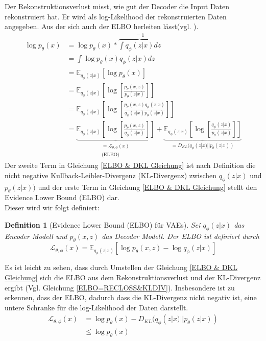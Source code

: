 \documentclass[%
thesis=student,%
coverpage=false,%
titlepage=false,%
headmarks=true, %
german,%
font=libertine, %
math=newpxtx, %
BCOR=5mm,%
coverBCOR=11mm%
]{tumbook}
\theoremstyle{break}
\newtheorem{definition}{Definition}[section]
\begin{document}
Der Rekonstruktionsverlust misst, wie gut der Decoder die Input Daten rekonstruiert hat. Er wird als log-Likelihood der rekonstruierten Daten angegeben.
Aus der sich auch der ELBO herleiten lässt(vgl. \cite{IntroductiontoVAEs}). \\
\begin{align}
 	\log p_\theta(x) &= \log p_\theta(x) * \overbrace{\int q_\phi(z|x) dz}^{=1} \\
 	&= \int \log p_\theta(x) q_\phi(z|x) dz \\
 	&= \mathbb{E}_{q_\phi(z|x)}[\log p_\theta(x)] \\
 	&= \mathbb{E}_{q_\phi(z|x)}\left[\log\left[ \frac{p_\theta(x,z)}{p_\theta(z|x)}\right]\right] \\
 	&= \mathbb{E}_{q_\phi(z|x)}\left[\log\left[ \frac{p_\theta(x,z)q_\phi(z|x)}{q_\phi(z|x)p_\theta(z|x)}\right]\right] \\
 	&= \underbrace{\mathbb{E}_{q_\phi(z|x)}\left[\log\left[ \frac{p_\theta(x,z)}{q_\phi(z|x)}\right]\right]}_{\substack{\text{$= \mathcal{L}_{\theta,\phi}(x)$}\\\text{(ELBO)}}} + \underbrace{\mathbb{E}_{q_\phi(z|x)}\left[\log\left[ \frac{q_\phi(z|x)}{p_\theta(z|x)}\right]\right]}_{=D_{KL}(q_\phi(z|x)||p_\theta(z|x))} \label{ELBO & DKL Gleichung}
\end{align}
Der zweite Term in Gleichung \ref{ELBO & DKL Gleichung} ist nach Definition die nicht negative Kullback-Leibler-Divergenz (KL-Divergenz) zwischen $q_\phi(z|x)$ und $p_\theta(z|x))$ und der erste Term in Gleichung \ref{ELBO & DKL Gleichung} stellt den Evidence Lower Bound (ELBO) dar.\\
Dieser wird wir folgt definiert:\\
\begin{definition}[Evidence Lower Bound (ELBO) für VAEs]
	Sei $q_\phi(z|x)$ das Encoder Modell und $p_\theta(x,z)$ das Decoder Modell. Der ELBO ist definiert durch
	$$ \mathcal{L}_{\theta,\phi}(x) = \mathbb{E}_{q_\phi(z|x)}[\log p_\theta(x,z) - \log q_\phi(z|x)] $$ 
\end{definition}\noindent
Es ist leicht zu sehen, dass durch Umstellen der Gleichung \ref{ELBO & DKL Gleichung} sich die ELBO aus dem Rekonstruktionsverlust und der KL-Divergenz ergibt (Vgl. Gleichung \ref{ELBO=RECLOSS&KLDIV}). Insbesondere ist zu erkennen, dass der ELBO, dadurch dass die KL-Divergenz nicht negativ ist, eine untere Schranke für die log-Likelihood der Daten darstellt. 
\begin{align}
	\mathcal{L}_{\theta,\phi}(x) &= \log p_\theta(x) - D_{KL}(q_\phi(z|x)||p_\theta(z|x)) \label{ELBO=RECLOSS&KLDIV}\\
	&\leq 	\log p_\theta(x) 
\end{align}\noindent
\end{document}
